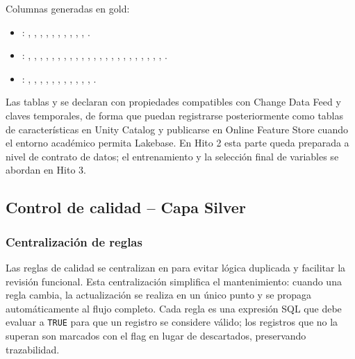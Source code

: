 \documentclass[12pt,a4paper]{article}
\begin{document}
Columnas generadas en gold:
\begin{itemize}
    \item {}: , , , , , , , , , , .
    \item {}: , , , , , , , , , , , , , , , , , , , , , , , .
    \item {}: , , , , , , , , , , , .
\end{itemize}

Las tablas  y  se declaran con propiedades compatibles con Change Data Feed y claves temporales, de forma que puedan registrarse posteriormente como tablas de características en Unity Catalog y publicarse en Online Feature Store cuando el entorno académico permita Lakebase. En Hito 2 esta parte queda preparada a nivel de contrato de datos; el entrenamiento y la selección final de variables se abordan en Hito 3.

\subsection{Control de calidad -- Capa Silver}

\subsubsection{Centralización de reglas}

Las reglas de calidad se centralizan en  para evitar lógica duplicada y facilitar la revisión funcional. Esta centralización simplifica el mantenimiento: cuando una regla cambia, la actualización se realiza en un único punto y se propaga automáticamente al flujo completo. Cada regla es una expresión SQL que debe evaluar a \texttt{TRUE} para que un registro se considere válido; los registros que no la superan son marcados con el flag  en lugar de descartados, preservando trazabilidad.
\end{document}
